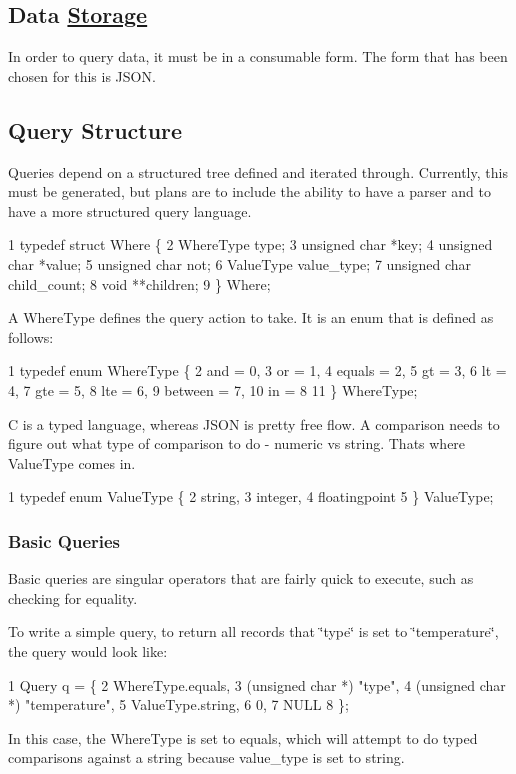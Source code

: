 \subsection*{Data \hyperlink{struct_storage}{Storage}}

In order to query data, it must be in a consumable form. The form that has been chosen for this is J\+S\+O\+N.

\subsection*{Query Structure}

Queries depend on a structured tree defined and iterated through. Currently, this must be generated, but plans are to include the ability to have a parser and to have a more structured query language.


\begin{DoxyCode}
1 typedef struct Where \{
2   WhereType type;
3   unsigned char *key;
4   unsigned char *value;
5   unsigned char not;
6   ValueType value\_type;
7   unsigned char child\_count;
8   void **children;
9 \} Where;
\end{DoxyCode}


A {\ttfamily Where\+Type} defines the query action to take. It is an {\ttfamily enum} that is defined as follows\+:


\begin{DoxyCode}
1 typedef enum WhereType \{
2   and     = 0,
3   or      = 1,
4   equals  = 2,
5   gt      = 3,
6   lt      = 4,
7   gte     = 5,
8   lte     = 6,
9   between = 7,
10   in      = 8
11 \} WhereType;
\end{DoxyCode}


C is a typed language, whereas J\+S\+O\+N is pretty free flow. A comparison needs to figure out what type of comparison to do -\/ {\ttfamily numeric} vs {\ttfamily string}. That\textquotesingle{}s where {\ttfamily Value\+Type} comes in.


\begin{DoxyCode}
1 typedef enum ValueType \{
2   string,
3   integer,
4   floatingpoint
5 \} ValueType;
\end{DoxyCode}


\subsubsection*{Basic Queries}

Basic queries are singular operators that are fairly quick to execute, such as checking for equality.

To write a simple query, to return all records that \char`\"{}type\char`\"{} is set to \char`\"{}temperature\char`\"{}, the query would look like\+:


\begin{DoxyCode}
1 Query q = \{
2   WhereType.equals,
3   (unsigned char *) "type",
4   (unsigned char *) "temperature",
5   ValueType.string,
6   0,
7   NULL
8 \};
\end{DoxyCode}


In this case, the {\ttfamily Where\+Type} is set to {\ttfamily equals}, which will attempt to do typed comparisons against a {\ttfamily string} because {\ttfamily value\+\_\+type} is set to {\ttfamily string}. 